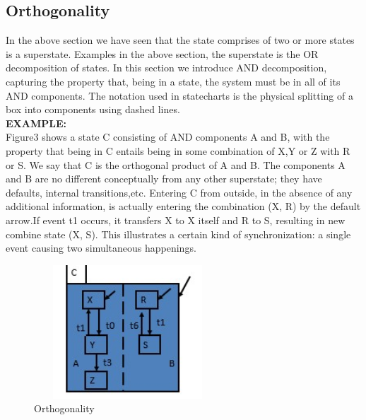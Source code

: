 \documentclass[a4paper,12pt,oneside]{article}
\begin{document}
\subsection{Orthogonality}
In the above section we have seen that the state comprises of two or more states is a superstate. Examples in the above section, the superstate is the OR decomposition of states. In this section we introduce AND decomposition, capturing the property that, being in a state, the system must be in all of its AND components. The notation used in statecharts is the physical splitting of a box into components using dashed lines.\\
\noindent
\textbf{EXAMPLE:}\\
Figure3 shows a state C consisting of AND components A and B, with the property that being in C entails being in some combination of X,Y or Z with R or S. We say that C is the orthogonal product of A and B. The components A and B are no different conceptually from any other superstate; they have defaults, internal transitions,etc. Entering C from outside, in the absence of any additional information, is actually entering the combination (X, R) by the default arrow.If event t1 occurs, it transfers X to X itself and R to S, resulting in new combine state (X, S). This illustrates a certain kind of synchronization: a single event causing two simultaneous  happenings.\\
\begin{figure}[H]
\centering
\includegraphics[width=7cm,height=5cm]{Screenshot002.jpg}
\caption{Orthogonality}
\end{figure}
\newpage
\end{document}
